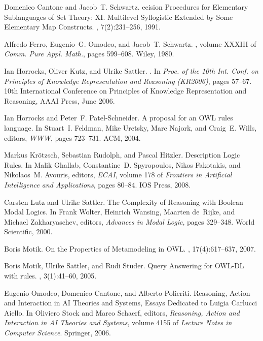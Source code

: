 \documentclass[a4paper,UKenglish]{lipics}
\begin{document}
\begin{small}
\begin{thebibliography}{10}
Domenico Cantone and Jacob~T. Schwartz.
ecision {P}rocedures for {E}lementary {S}ublanguages of {S}et
  {T}heory: {XI}. {M}ultilevel {S}yllogistic {E}xtended by {S}ome {E}lementary
  {M}ap {C}onstructs.
, 7(2):231--256, 1991.

Alfredo Ferro, Eugenio~G. Omodeo, and Jacob~T. Schwartz.
, volume XXXIII of {\em Comm.
  Pure Appl. Math.}, pages 599--608.
\newblock Wiley, 1980.

Ian Horrocks, Oliver Kutz, and Ulrike Sattler.
.
\newblock In {\em Proc. of the 10th Int. Conf. on Principles of Knowledge
  Representation and Reasoning (KR2006)}, pages 57--67. 10th International
  Conference on Principles of Knowledge Representation and Reasoning, AAAI
  Press, June 2006.

Ian Horrocks and Peter~F. Patel-Schneider.
\newblock A proposal for an {OWL} rules language.
\newblock In Stuart~I. Feldman, Mike Uretsky, Marc Najork, and Craig~E. Wills,
  editors, {\em WWW}, pages 723--731. ACM, 2004.

Markus Kr{\"o}tzsch, Sebastian Rudolph, and Pascal Hitzler.
\newblock Description {L}ogic {R}ules.
\newblock In Malik Ghallab, Constantine~D. Spyropoulos, Nikos Fakotakis, and
  Nikolaos~M. Avouris, editors, {\em ECAI}, volume 178 of {\em Frontiers in
  Artificial Intelligence and Applications}, pages 80--84. IOS Press, 2008.

Carsten Lutz and Ulrike Sattler.
\newblock The {C}omplexity of {R}easoning with {B}oolean {M}odal {L}ogics.
\newblock In Frank Wolter, Heinrich Wansing, Maarten de~Rijke, and Michael
  Zakharyaschev, editors, {\em Advances in Modal Logic}, pages 329--348. World
  Scientific, 2000.

Boris Motik.
\newblock On the {P}roperties of {M}etamodeling in {OWL}.
, 17(4):617--637, 2007.

Boris Motik, Ulrike Sattler, and Rudi Studer.
\newblock Query {A}nswering for {OWL-DL} with rules.
, 3(1):41--60, 2005.

Eugenio Omodeo, Domenico Cantone, and Alberto Policriti.
\newblock Reasoning, {A}ction and {I}nteraction in {AI} {T}heories and
  {S}ystems, {E}ssays {D}edicated to {L}uigia {C}arlucci {A}iello.
\newblock In Oliviero Stock and Marco Schaerf, editors, {\em Reasoning, Action
  and Interaction in AI Theories and Systems}, volume 4155 of {\em Lecture
  Notes in Computer Science}. Springer, 2006.


\end{thebibliography}
\end{small}
\end{document}
